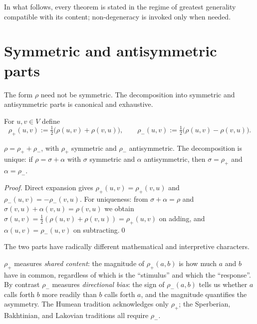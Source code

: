 In what follows, every theorem is stated in the regime of greatest
generality compatible with its content; non-degeneracy is invoked only
when needed.

\section{Symmetric and antisymmetric parts}\label{sec:sym-antisym}

The form $\rho$ need not be symmetric. The decomposition into symmetric and
antisymmetric parts is canonical and exhaustive.

\begin{definition}\label{def:sym-asym}
For $u,v\in V$ define
\[
\rho_+(u,v):=\tfrac{1}{2}\bigl(\rho(u,v)+\rho(v,u)\bigr),\qquad
\rho_-(u,v):=\tfrac{1}{2}\bigl(\rho(u,v)-\rho(v,u)\bigr).
\]
\end{definition}

\begin{proposition}[Decomposition]\label{prop:sym-decomp}
$\rho=\rho_+ + \rho_-$, with $\rho_+$ symmetric and $\rho_-$ antisymmetric.
The decomposition is unique: if $\rho=\sigma+\alpha$ with $\sigma$
symmetric and $\alpha$ antisymmetric, then $\sigma=\rho_+$ and
$\alpha=\rho_-$.
\end{proposition}

\begin{proof}
Direct expansion gives $\rho_+(u,v)=\rho_+(v,u)$ and
$\rho_-(u,v)=-\rho_-(v,u)$. For uniqueness: from $\sigma+\alpha=\rho$ and
$\sigma(v,u)+\alpha(v,u)=\rho(v,u)$ we obtain
$\sigma(u,v)=\tfrac12(\rho(u,v)+\rho(v,u))=\rho_+(u,v)$ on adding, and
$\alpha(u,v)=\rho_-(u,v)$ on subtracting.\qed
\end{proof}

The two parts have radically different mathematical and interpretive
characters.

\begin{interpretation}\label{int:sym-asym}
$\rho_+$ measures \emph{shared content}: the magnitude of $\rho_+(a,b)$ is
how much $a$ and $b$ have in common, regardless of which is the
``stimulus'' and which the ``response''. By contrast $\rho_-$ measures
\emph{directional bias}: the sign of $\rho_-(a,b)$ tells us whether $a$
calls forth $b$ more readily than $b$ calls forth $a$, and the magnitude
quantifies the asymmetry. The Humean tradition acknowledges only $\rho_+$;
the Sperberian, Bakhtinian, and Lakovian traditions all require $\rho_-$.
\end{interpretation}

